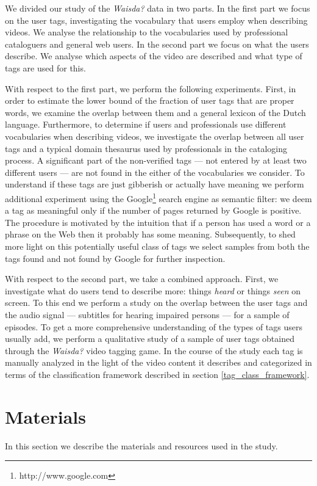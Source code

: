 We divided our study of the \emph{Waisda?} data in two parts. In the first
part we focus on the user tags, investigating the vocabulary that users employ
when describing videos. We analyse the relationship to the vocabularies used
by professional cataloguers and general web users. In the second part we focus
on what the users describe. We analyse which aspects of the video are
described and what type of tags are used for this.

With respect to the first part, we perform the following experiments. First, in order to estimate the lower bound of the fraction of user tags that are proper words, we examine the overlap between them and a general lexicon of the Dutch language. Furthermore, to determine if
users and professionals use different vocabularies when describing videos, we
investigate the overlap between all user tags and a typical domain thesaurus
used by professionals in the cataloging process. A significant part of the
non-verified tags --- not entered by at least two different users --- are not
found in the either of the vocabularies we consider. To understand if these
tags are just gibberish or actually have meaning we perform additional
experiment using the Google\footnote{http://www.google.com} search engine as
semantic filter: we deem a tag as meaningful only if the number of pages
returned by Google is positive. The procedure is motivated by the intuition
that if a person has used a word or a phrase on the Web then it probably has
some meaning. Subsequently, to shed more light on this potentially useful
class of tags we select samples from both the tags found and not found by
Google for further inspection.

With respect to the second part, we take a combined approach. First, we
investigate what do users tend to describe more: things \textit{heard} or
things \textit{seen} on screen. To this end we perform a study on the overlap
between the user tags and the audio signal --- subtitles for hearing impaired
persons --- for a sample of episodes. To get a more comprehensive
understanding of the types of tags users usually add, we perform a qualitative
study of a sample of user tags obtained through the \emph{Waisda?} video
tagging game. In the course of the study each tag is manually analyzed in the
light of the video content it describes and categorized in terms of the
classification framework described in section \ref{tag_class_framework}.

\section{Materials}\label{kcap:sec:materials}
In this section we describe the materials and resources used in the study.

